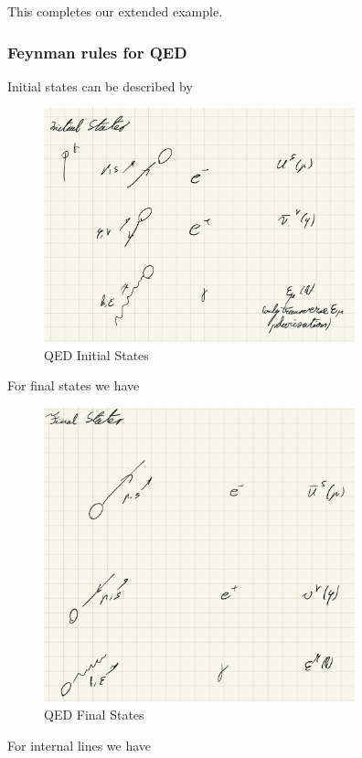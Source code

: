 \documentclass{article}
\theoremstyle{definition}
\begin{document}
This completes our extended example.

\subsubsection{Feynman rules for QED}

Initial states can be described by

\begin{figure}[H]
  \centering
  \includegraphics[width=9cm]{res/QFT/qed_initial_states}
  \caption{QED Initial States}
  \label{qed_initial_states}
\end{figure}

For final states we have

\begin{figure}[H]
  \centering
  \includegraphics[width=9cm]{res/QFT/qed_final_states}
  \caption{QED Final States}
  \label{qed_final_states}
\end{figure}

For internal lines we have
\end{document}

